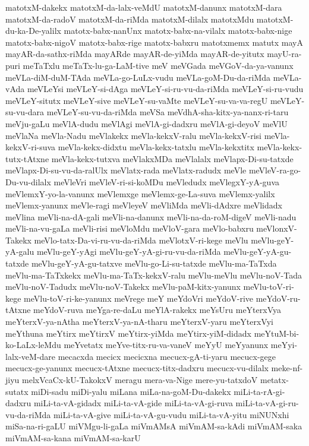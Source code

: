 {matotxM-dakekx
matotxM-da-lalx-veMdU
matotxM-danunx
matotxM-dara
matotxM-da-radoV
matotxM-da-riMda
matotxM-dilalx
matotxMdu
matotxM-du-ka-De-yalilx
matotx-babx-nanUnx
matotx-babx-na-vilalx
matotx-babx-nige
matotx-babx-nigoV
matotx-babx-rige
matotx-babxru
matotxmemx
matutx
mayA
mayAR-da-sathx-riMda
mayARde
mayAR-de-yiMda
mayAR-de-yitutx
mayU-ra-puri
meTaTxlu
meTaTx-lu-ga-LaM-tive
meV
meVGada
meVGoV-da-ya-vanunx
meVLa-diM-duM-TAda
meVLa-go-LuLx-vudu
meVLa-goM-Du-da-riMda
meVLa-vAda
meVLeYsi
meVLeY-si-dAga
meVLeY-si-ru-vu-da-riMda
meVLeY-si-ru-vudu
meVLeY-situtx
meVLeY-sive
meVLeY-su-vaMte
meVLeY-su-va-va-regU
meVLeY-su-vu-dara
meVLeY-su-vu-da-riMda
meVSa
meVdhA-sha-kitx-ya-nanx-ri-taru
meVju-gaLu
meVlA-dudu
meVlAgi
meVlA-gi-dadxru
meVlA-gi-deyoV
meVlU
meVlaNa
meVla-Nadu
meVlakekx
meVla-kekxV-ralu
meVla-kekxV-risi
meVla-kekxV-ri-suva
meVla-kekx-didxtu
meVla-kekx-tatxlu
meVla-kekxtitx
meVla-kekx-tutx-tAtxne
meVla-kekx-tutxva
meVlakxMDa
meVlalalx
meVlapx-Di-su-tatxde
meVlapx-Di-su-vu-da-ralUlx
meVlatx-rada
meVlatx-radudx
meVle
meVleV-ra-go-Du-vu-dilalx
meVleVri
meVleV-ri-si-koMDu
meVledudx
meVlegxY-yA-guva
meVlemxY-yo-la-vanunx
meVlemxge
meVlemx-ge-La-suva
meVlemx-yalilx
meVlemx-yanunx
meVle-ragi
meVleyeV
meVliMda
meVli-dAdxre
meVlidadx
meVlina
meVli-na-dA-gali
meVli-na-danunx
meVli-na-da-roM-digeV
meVli-nadu
meVli-na-vu-gaLa
meVli-risi
meVloMdu
meVloV-gara
meVlo-babxru
meVlonxV-Takekx
meVlo-tatx-Da-vi-ru-vu-da-riMda
meVlotxV-ri-kege
meVlu
meVlu-geY-yA-galu
meVlu-geY-yAgi
meVlu-geY-yA-gi-ru-vu-da-riMda
meVlu-geY-yA-gu-tatxde
meVlu-geY-yA-gu-tatxve
meVlu-go-Li-su-tatxde
meVlu-ma-TaTxda
meVlu-ma-TaTxkekx
meVlu-ma-TaTx-kekxV-ralu
meVlu-meVlu
meVlu-noV-Tada
meVlu-noV-Tadudx
meVlu-noV-Takekx
meVlu-paM-kitx-yanunx
meVlu-toV-ri-kege
meVlu-toV-ri-ke-yanunx
meVrege
meY
meYdoVri
meYdoV-rive
meYdoV-ru-tAtxne
meYdoV-ruva
meYga-re-daLu
meYlA-rakekx
meYsUru
meYterxVya
meYterxV-ya-nAtha
meYterxV-ya-nA-tharu
meYterxV-yaru
meYterxVyi
meYthuna
meYtirx
meYtirxV
meYtirx-yiMda
meYtirx-yiM-didadx
meYtuM-bi-ko-LaLx-leMdu
meYvetatx
meYve-titx-ru-va-vaneV
meYyU
meYyanunx
meYyi-lalx-veM-dare
mecacxda
mecicx
mecicxna
mecucx-gA-ti-yaru
mecucx-gege
mecucx-ge-yanunx
mecucx-tAtxne
mecucx-titx-dadxru
mecucx-vu-dilalx
meke-nf-jiyu
melxVcaCx-kU-TakokxV
meragu
mera-va-Nige
mere-yu-tatxdoV
metatx-sutatx
miDi-sadu
miDi-yalu
miLana
miLa-na-goM-Du-dakekx
miLi-ta-rA-gi-dadxru
miLi-ta-vA-gidadx
miLi-ta-vA-gide
miLi-ta-vA-gi-ruva
miLi-ta-vA-gi-ru-vu-da-riMda
miLi-ta-vA-give
miLi-ta-vA-gu-vudu
miLi-ta-vA-yitu
miNUNxhi
miSa-na-ri-gaLU
miVMgu-li-gaLa
miVmAMsA
miVmAM-sa-kAdi
miVmAM-saka
miVmAM-sa-kana
miVmAM-sa-karU
}
